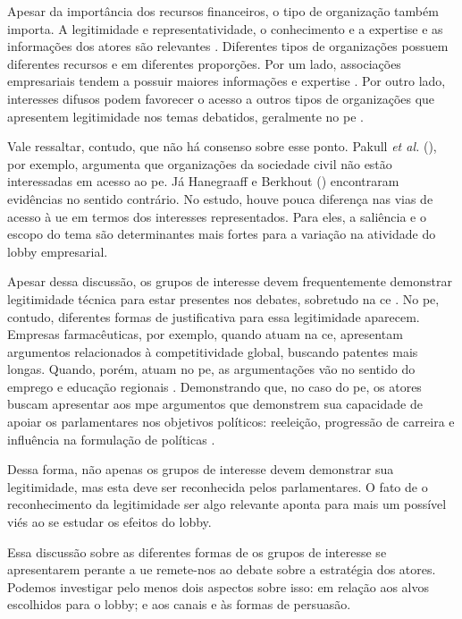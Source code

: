     Apesar da importância dos recursos financeiros, o tipo de organização também importa. A legitimidade e representatividade, o conhecimento e a expertise e as informações dos atores são relevantes \cite{Coen2019, dur_measuring_2008}. Diferentes tipos de organizações possuem diferentes recursos e em diferentes proporções. Por um lado, associações empresariais tendem a possuir maiores informações e expertise \cite{dur20212wholobbies}. Por outro lado, interesses difusos podem favorecer o acesso a outros tipos de organizações que apresentem legitimidade nos temas debatidos, geralmente no \acrshort{pe} \cite{kluver2015legislative}. 

    Vale ressaltar, contudo, que não há consenso sobre esse ponto. Pakull \textit{et al.} (\citeyear{Pakull2020}), por exemplo, argumenta que organizações da sociedade civil não estão interessadas em acesso ao \acrshort{pe}. Já Hanegraaff e Berkhout (\citeyear{Hanegraaff2019}) encontraram evidências no sentido contrário. No estudo, houve pouca diferença nas vias de acesso à \acrshort{ue} em termos dos interesses representados. Para eles, a saliência e o escopo do tema são determinantes mais fortes para a variação na atividade do lobby empresarial.

    Apesar dessa discussão, os grupos de interesse devem frequentemente demonstrar legitimidade técnica para estar presentes nos debates, sobretudo na \acrshort{ce} \allowbreak\cite{Bouwen2002}. No \acrshort{pe}, contudo, diferentes formas de justificativa para essa legitimidade aparecem. Empresas farmacêuticas, por exemplo, quando atuam na \acrshort{ce}, apresentam argumentos relacionados à competitividade global, buscando patentes mais longas. Quando, porém, atuam no \acrshort{pe}, as argumentações vão no sentido do emprego e educação regionais \cite{earnshaw2002no, coen2000corporate}. Demonstrando que, no caso do \acrshort{pe}, os atores buscam apresentar aos \acrshort{mpe} argumentos que demonstrem sua capacidade de apoiar os parlamentares nos objetivos políticos: reeleição, progressão de carreira e influência na formulação de políticas \cite{Ibenskas2021}.
    
    Dessa forma, não apenas os grupos de interesse devem demonstrar sua legitimidade, mas esta deve ser reconhecida pelos parlamentares. O fato de o reconhecimento da legitimidade ser algo relevante aponta para mais um possível viés ao se estudar os efeitos do lobby.

    Essa discussão sobre as diferentes formas de os grupos de interesse se apresentarem perante a \acrshort{ue} remete-nos ao debate sobre a estratégia dos atores. Podemos investigar pelo menos dois aspectos sobre isso: em relação aos alvos escolhidos para o lobby; e aos canais e às formas de persuasão.


